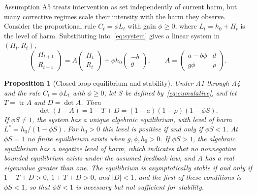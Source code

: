 \documentclass[12pt]{article}
\newtheorem{proposition}{Proposition}
\theoremstyle{remark}
\begin{document}
Assumption A5 treats intervention as set independently of current harm, but many corrective regimes scale their intensity with the harm they observe. Consider the proportional rule $C_t = \phi L_t$ with gain $\phi \ge 0$, where $L_t = h_0 + H_t$ is the level of harm. Substituting into~\eqref{eq:system} gives a linear system in $(H_t, R_t)$,
\begin{equation}
\begin{pmatrix} H_{t+1} \\ R_{t+1} \end{pmatrix} = A \begin{pmatrix} H_t \\ R_t \end{pmatrix} + \phi h_0 \begin{pmatrix} -b \\ g \end{pmatrix}, \qquad A = \begin{pmatrix} a - b\phi & d \\ g\phi & \rho \end{pmatrix}.
\end{equation}

\begin{proposition}[Closed-loop equilibrium and stability]
\label{prop:closed}
Under A1 through A4 and the rule $C_t = \phi L_t$ with $\phi \ge 0$, let $S$ be defined by~\eqref{eq:cumulative}, and let $T = \operatorname{tr}A$ and $D = \det A$. Then
\begin{equation}
\det(I - A) = 1 - T + D = (1-a)(1-\rho)(1 - \phi S).
\end{equation}
If $\phi S \ne 1$, the system has a unique algebraic equilibrium, with level of harm $L^{*} = h_0/(1 - \phi S)$. For $h_0 > 0$ this level is positive if and only if $\phi S < 1$. At $\phi S = 1$ no finite equilibrium exists when $g, \phi, h_0 > 0$. If $\phi S > 1$, the algebraic equilibrium has a negative level of harm, which indicates that no nonnegative bounded equilibrium exists under the assumed feedback law, and $A$ has a real eigenvalue greater than one. The equilibrium is asymptotically stable if and only if $1 - T + D > 0$, $1 + T + D > 0$, and $|D| < 1$, and the first of these conditions is $\phi S < 1$, so that $\phi S < 1$ is necessary but not sufficient for stability.
\end{proposition}
\end{document}

